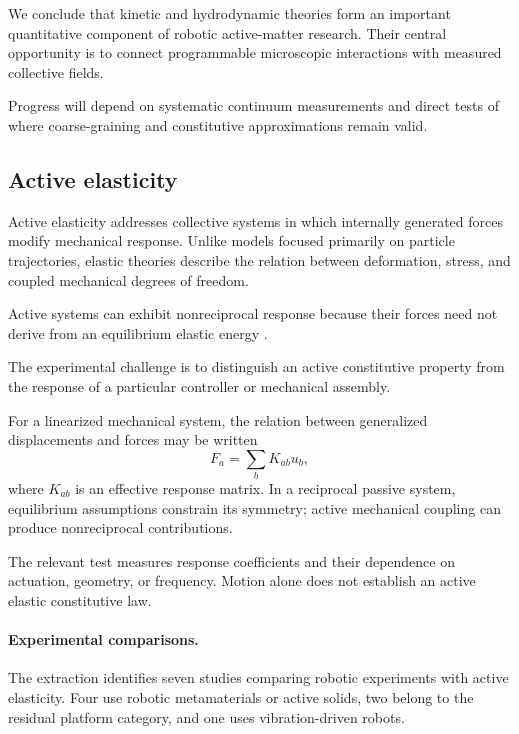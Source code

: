 We conclude that kinetic and hydrodynamic
theories form an important quantitative
component of robotic active-matter research.
Their central opportunity is to connect
programmable microscopic interactions with
measured collective fields.

Progress will depend on systematic continuum
measurements and direct tests of where
coarse-graining and constitutive
approximations remain valid.

\subsection{Active elasticity}
\label{sec:theory-active-elasticity}

Active elasticity addresses collective systems in which
internally generated forces modify mechanical response.
Unlike models focused primarily on particle trajectories,
elastic theories describe the relation between deformation,
stress, and coupled mechanical degrees of freedom.

Active systems can exhibit nonreciprocal response
because their forces need not derive from an
equilibrium elastic energy
\cite{Scheibner2020odd}.

The experimental challenge is to distinguish
an active constitutive property from
the response of a particular controller
or mechanical assembly.

For a linearized mechanical system,
the relation between generalized
displacements and forces may be written
\begin{equation}
F_a=\sum_b K_{ab}u_b,
\label{eq:theory-active-stiffness}
\end{equation}
where $K_{ab}$ is an effective
response matrix. In a reciprocal
passive system, equilibrium
assumptions constrain its symmetry;
active mechanical coupling can
produce nonreciprocal contributions.

The relevant test measures response
coefficients and their dependence
on actuation, geometry, or frequency.
Motion alone does not establish
an active elastic constitutive law.

\paragraph*{Experimental comparisons.}

The extraction identifies seven studies
comparing robotic experiments with
active elasticity. Four use robotic
metamaterials or active solids, two
belong to the residual platform category,
and one uses vibration-driven robots.

